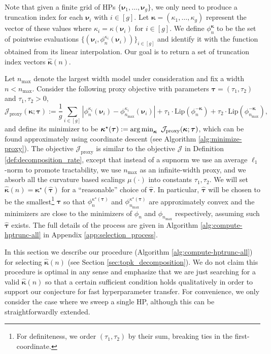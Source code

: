 \documentclass{article} %
\newcommand{\bhp}{\bm{\nu}}                       %
\newcommand{\hptrunc}{\kappa}
\newcommand{\bhptrunc}{\bm{\kappa}}
\newcommand{\gridsize}{g}
\newcommand{\Lip}{\mathrm{Lip}}
\newcommand{\decompobj}{\mathcal{J}}
\newcommand{\btau}{\boldsymbol{\tau}}
\begin{document}
Note that given a finite grid of HPs $\{\bhp_1, \ldots, \bhp_{\gridsize}\}$, we only need to produce a truncation index for each $\bhp_i$ with $i \in [\gridsize]$.  Let $\bhptrunc = (\hptrunc_1, \ldots, \hptrunc_{\gridsize})$  represent the vector of these values where $\hptrunc_i = \hptrunc(\bhp_i)$ for $i \in [\gridsize]$. We define $\phi_n^{\bhptrunc}$ to be the set of pointwise evaluations $\{(\bhp_i, \phi_n^{\hptrunc_i}(\bhp_i))\}_{i \in [\gridsize]}$ and identify it with the function obtained from its linear interpolation. Our goal is to return a set of truncation index vectors $\hat{\bhptrunc}(n)$.

Let $n_{\max}$ denote the largest width model under consideration and fix a width $n < n_{\max}$. Consider the following proxy objective with parameters $\btau = (\tau_1, \tau_2)$ and $\tau_1, \tau_2 > 0$,
\begin{equation}\label{eq:decomp_objective_proxy}
    \decompobj_{\mathrm{proxy}}(\bhptrunc; \btau) := \frac{1}{\gridsize} \sum\limits_{i \in [\gridsize]} |\phi_n^{\hptrunc_i}(\bhp_i) - \phi_{n_{\max}}^{\hptrunc_i}(\bhp_i)| + \tau_1 \cdot\Lip(\phi_n^{-\bhptrunc}) + \tau_2 \cdot \Lip(\phi_{n_{\max}}^{-\bhptrunc}),
\end{equation}
and define its minimizer to be $\bhptrunc^\star(\btau) := \argmin_{\bhptrunc}~\decompobj_{\mathrm{proxy}}(\bhptrunc; \btau)$, which can be found approximately using coordinate descent (see Algorithm \ref{alg:minimize-proxy}). The objective $\decompobj_{\mathrm{proxy}}$ is similar to the objective $\decompobj$ in Definition \ref{def:decomposition_rate}, except that instead of a supnorm we use an average $\ell_1$-norm to promote tractability, we use $n_{\max}$ as an infinite-width proxy, and we absorb all the curvature based scalings $\mu(\cdot)$ into constants $\tau_1, \tau_2$. We will set $\hat{\bhptrunc}(n) = \bhptrunc^\star(\hat{
\btau})$ for a ``reasonable'' choice of $\hat{\btau}$. In particular, $\hat{\btau}$ will be chosen to be the smallest\footnote{For definiteness, we order $(\tau_1, \tau_2)$ by their sum, breaking ties in the first-coordinate.} $\btau$ so that $\phi_n^{\hptrunc^\star(\btau)}$ and $\phi_{n_{\max}}^{\hptrunc^\star(\btau)}$ are approximately convex and the minimizers are close to the minimizers of $\phi_n$ and $\phi_{n_{\max}}$ respectively, assuming such $\hat{\btau}$ exists. The full details of the process are given in Algorithm \ref{alg:compute-hptrunc-all} in Appendix \ref{app:selection_process}.

In this section we describe our procedure (Algorithm \ref{alg:compute-hptrunc-all}) for selecting $\hat{\bhptrunc}(n)$ (see Section \ref{sec:topk_decomposition}).  We do not claim this procedure is optimal in any sense and emphasize that we are just searching for a valid $\hat{\bhptrunc}(n)$ so that a certain sufficient condition holds qualitatively in order to support our conjecture for fast hyperparameter transfer. For convenience, we only consider the case where we sweep a single HP, although this can be straightforwardly extended. 
\end{document}
